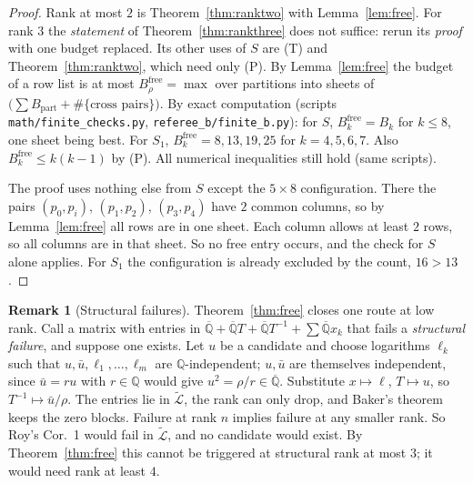 \documentclass[11pt,a4paper]{article}
\theoremstyle{plain}
\theoremstyle{definition}
\newtheorem{remark}[lemma]{Remark}
\newcommand{\Q}{\mathbb{Q}}
\newcommand{\Qbar}{\overline{\mathbb{Q}}}
\newcommand{\Lt}{\widetilde{\mathcal{L}}}
\newcommand{\free}{\mathrm{free}}
\newcommand{\scr}[1]{\nolinkurl{#1}}
\begin{document}
\begin{proof}
Rank at most $2$ is Theorem~\ref{thm:ranktwo} with Lemma~\ref{lem:free}. For rank $3$ the \emph{statement} of Theorem~\ref{thm:rankthree} does not suffice: rerun its \emph{proof} with one budget replaced. Its other uses of $S$ are (T) and Theorem~\ref{thm:ranktwo}, which need only (P). By Lemma~\ref{lem:free} the budget of a row list is at most
$B^{\free}_{\rho}=\max$ over partitions into sheets of $\bigl(\sum B_{\text{part}}+\#\{\text{cross pairs}\}\bigr)$. By exact computation (scripts \scr{math/finite_checks.py}, \scr{referee_b/finite_b.py}): for $S$, $B^{\free}_{k}=B_{k}$ for $k\le8$, one sheet being best. For $S_{1}$, $B^{\free}_{k}=8,13,19,25$ for $k=4,5,6,7$. Also $B^{\free}_{k}\le k(k-1)$ by (P). All numerical inequalities still hold (same scripts).

The proof uses nothing else from $S$ except the $5\times8$ configuration. There the pairs $(p_{0},p_{i})$, $(p_{1},p_{2})$, $(p_{3},p_{4})$ have $2$ common columns, so by Lemma~\ref{lem:free} all rows are in one sheet. Each column allows at least $2$ rows, so all columns are in that sheet. So no free entry occurs, and the check for $S$ alone applies. For $S_{1}$ the configuration is already excluded by the count, $16>13$.
\end{proof}

\begin{remark}[Structural failures]\label{rem:gtwo}
Theorem~\ref{thm:free} closes one route at low rank. Call a matrix with entries in $\Qbar+\Qbar T+\Qbar T^{-1}+\sum\Qbar x_{k}$ that fails a \emph{structural failure}, and suppose one exists. Let $u$ be a candidate and choose logarithms $\ell_{k}$ such that $u,\bar u,\ell_{1},\dots,\ell_{m}$ are $\Q$-independent; $u,\bar u$ are themselves independent, since $\bar u=ru$ with $r\in\Q$ would give $u^{2}=\rho/r\in\Qbar$. Substitute $x\mapsto\ell$, $T\mapsto u$, so $T^{-1}\mapsto\bar u/\rho$. The entries lie in $\Lt$, the rank can only drop, and Baker's theorem keeps the zero blocks. Failure at rank $n$ implies failure at any smaller rank. So Roy's Cor.~1 would fail in $\Lt$, and no candidate would exist. By Theorem~\ref{thm:free} this cannot be triggered at structural rank at most $3$; it would need rank at least $4$.
\end{remark}
\end{document}
